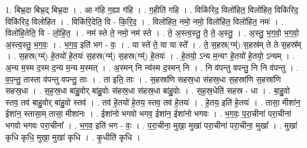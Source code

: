 \documentclass[17pt]{extarticle}
\begin{document}
1. बिभ्र॒दा बिभ्र॒द् बिभ्र॒दा । . आ ग॑हि ग॒ह्या ग॑हि । . ग॒हीति॑ गहि । . विकि॑रिद॒ विलो॑हित॒ विलो॑हित॒ विकि॑रिद॒ विकि॑रिद॒ विलो॑हित । . विकि॑रि॒देति॒ वि - कि॒रि॒द॒ । . विलो॑हित॒ नमो॒ नमो॒ विलो॑हित॒ विलो॑हित॒ नमः॑ । . विलो॑हि॒तेति॒ वि - लो॒हि॒त॒ । . नम॑ स्ते ते॒ नमो॒ नम॑ स्ते । . ते॒ अ॒स्त्व॒स्तु॒ ते॒ ते॒ अ॒स्तु॒ । . अ॒स्तु॒ भ॒ग॒वो॒ भ॒ग॒वो॒ अ॒स्त्व॒स्तु॒ भ॒ग॒वः॒ । . भ॒ग॒व॒ इति॑ भग - वः॒ । . या स्ते॑ ते॒ या या स्ते᳚ । . ते॒ स॒हस्र(ग्म्॑) स॒हस्र॑म् ते ते स॒हस्र᳚म् । . स॒हस्र(ग्म्॑) हे॒तयो॑ हे॒तयः॑ स॒हस्र(ग्म्॑) स॒हस्र(ग्म्॑) हे॒तयः॑ । . हे॒तयो॒ ऽन्य म॒न्यꣳ हे॒तयो॑ हे॒तयो॒ ऽन्यम् । . अ॒न्य म॒स्म द॒स्म द॒न्य म॒न्य म॒स्मत् । . अ॒स्मन् नि न्य॑स्म द॒स्मन् नि । . नि व॑पन्तु वपन्तु॒ नि नि व॑पन्तु । . व॒प॒न्तु॒ तास्ता व॑पन्तु वपन्तु॒ ताः । . ता इति॒ ताः । . स॒हस्रा॑णि सहस्र॒धा स॑हस्र॒धा स॒हस्रा॑णि स॒हस्रा॑णि सहस्र॒धा । . स॒ह॒स्र॒धा बा॑हु॒वोर् बा॑हु॒वोः स॑हस्र॒धा स॑हस्र॒धा बा॑हु॒वोः । . स॒ह॒स्र॒धेति॑ सहस्र - धा । . बा॒हु॒वो स्तव॒ तव॑ बाहु॒वोर् बा॑हु॒वो स्तव॑ । . तव॑ हे॒तयो॑ हे॒तय॒ स्तव॒ तव॑ हे॒तयः॑ । . हे॒तय॒ इति॑ हे॒तयः॑ । . तासा॒ मीशा॑न॒ ईशा॑न॒ स्तासा॒म् तासा॒ मीशा॑नः । . ईशा॑नो भगवो भगव॒ ईशा॑न॒ ईशा॑नो भगवः । . भ॒ग॒वः॒ प॒रा॒चीना॑ परा॒चीना॑ भगवो भगवः परा॒चीना᳚ । . भ॒ग॒व॒ इति॑ भग - वः॒ । . प॒रा॒चीना॒ मुखा॒ मुखा॑ परा॒चीना॑ परा॒चीना॒ मुखा᳚ । . मुखा॑ कृधि कृधि॒ मुखा॒ मुखा॑ कृधि । . कृ॒धीति॑ कृधि । \newline
\end{document}
